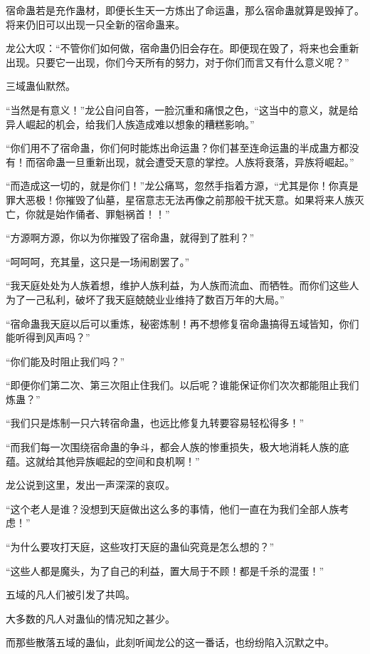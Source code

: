 \begin{this_body}
宿命蛊若是充作蛊材，即便长生天一方炼出了命运蛊，那么宿命蛊就算是毁掉了。将来仍旧可以出现一只全新的宿命蛊来。

龙公大叹：“不管你们如何做，宿命蛊仍旧会存在。即便现在毁了，将来也会重新出现。只要它一出现，你们今天所有的努力，对于你们而言又有什么意义呢？”

三域蛊仙默然。

“当然是有意义！”龙公自问自答，一脸沉重和痛恨之色，“这当中的意义，就是给异人崛起的机会，给我们人族造成难以想象的糟糕影响。”

“你们用不了宿命蛊，你们何时能炼出命运蛊？你们甚至连命运蛊的半成蛊方都没有！而宿命蛊一旦重新出现，就会遭受天意的掌控。人族将衰落，异族将崛起。”

“而造成这一切的，就是你们！”龙公痛骂，忽然手指着方源，“尤其是你！你真是罪大恶极！你摧毁了仙墓，星宿意志无法再像之前那般干扰天意。如果将来人族灭亡，你就是始作俑者、罪魁祸首！！”

“方源啊方源，你以为你摧毁了宿命蛊，就得到了胜利？”

“呵呵呵，充其量，这只是一场闹剧罢了。”

“我天庭处处为人族着想，维护人族利益，为人族而流血、而牺牲。而你们这些人为了一己私利，破坏了我天庭兢兢业业维持了数百万年的大局。”

“宿命蛊我天庭以后可以重炼，秘密炼制！再不想修复宿命蛊搞得五域皆知，你们能听得到风声吗？”

“你们能及时阻止我们吗？”

“即便你们第二次、第三次阻止住我们。以后呢？谁能保证你们次次都能阻止我们炼蛊？”

“我们只是炼制一只六转宿命蛊，也远比修复九转要容易轻松得多！”

“而我们每一次围绕宿命蛊的争斗，都会人族的惨重损失，极大地消耗人族的底蕴。这就给其他异族崛起的空间和良机啊！”

龙公说到这里，发出一声深深的哀叹。

“这个老人是谁？没想到天庭做出这么多的事情，他们一直在为我们全部人族考虑！”

“为什么要攻打天庭，这些攻打天庭的蛊仙究竟是怎么想的？”

“这些人都是魔头，为了自己的利益，置大局于不顾！都是千杀的混蛋！”

五域的凡人们被引发了共鸣。

大多数的凡人对蛊仙的情况知之甚少。

而那些散落五域的蛊仙，此刻听闻龙公的这一番话，也纷纷陷入沉默之中。


\end{this_body}
